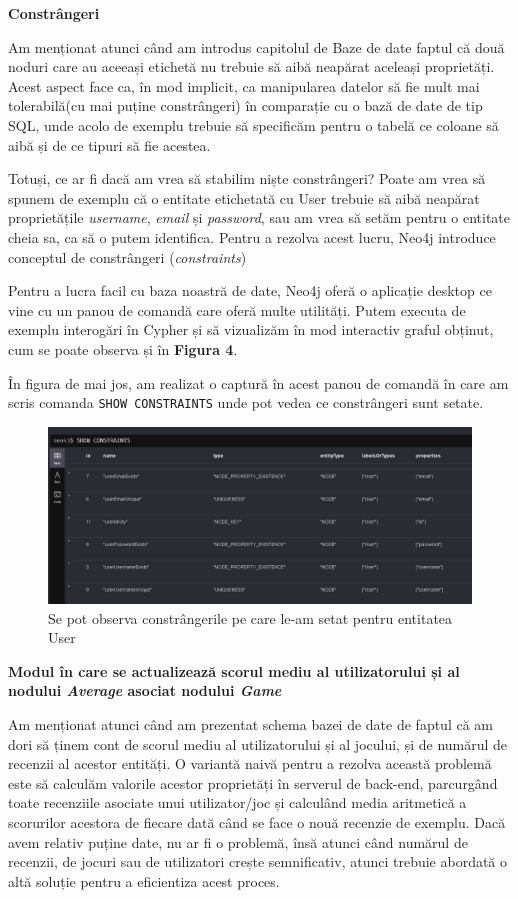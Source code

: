 \documentclass[12pt,a4paper]{report}
\begin{document}
\bigskip
\textbf{Constrângeri}
\bigskip

Am menționat atunci când am introdus capitolul de Baze de date faptul că două noduri care au aceeași etichetă nu trebuie să aibă neapărat aceleași proprietăți. Acest aspect face ca, în mod implicit, ca manipularea datelor să fie mult mai tolerabilă(cu mai puține constrângeri) în comparație cu o bază de date de tip SQL, unde acolo de exemplu trebuie să specificăm pentru o tabelă ce coloane să aibă și de ce tipuri să fie acestea.

Totuși, ce ar fi dacă am vrea să stabilim niște constrângeri? Poate am vrea să spunem de exemplu că o entitate etichetată cu User trebuie să aibă neapărat proprietățile \emph{username}, \emph{email} și \emph{password}, sau am vrea să setăm pentru o entitate cheia sa, ca să o putem identifica. Pentru a rezolva acest lucru, Neo4j introduce conceptul de constrângeri (\emph{constraints}) \cite{12}

Pentru a lucra facil cu baza noastră de date, Neo4j oferă o aplicație desktop ce vine cu un panou de comandă care oferă multe utilități. Putem executa de exemplu interogări în Cypher și să vizualizăm în mod interactiv graful obținut, cum se poate observa și în \textbf{Figura 4}.

În figura de mai jos, am realizat o captură în acest panou de comandă în care am scris comanda \texttt{SHOW CONSTRAINTS} unde pot vedea ce constrângeri sunt setate.

\begin{figure}[H]
\centering
\caption{}
\includegraphics[scale = 0.5]{exemplu_9_neo4j}
\caption*{Se pot observa constrângerile pe care le-am setat pentru entitatea User}
\end{figure}

\bigskip
\textbf{Modul în care se actualizează scorul mediu al utilizatorului și al nodului \emph{Average} asociat nodului \emph{Game}}
\bigskip

Am menționat atunci când am prezentat schema bazei de date de faptul că am dori să ținem cont de scorul mediu al utilizatorului și al jocului, și de numărul de recenzii al acestor entități. O variantă naivă pentru a rezolva această problemă este să calculăm valorile acestor proprietăți în serverul de back-end, parcurgând toate recenziile asociate unui utilizator/joc și calculând media aritmetică a scorurilor acestora de fiecare dată când se face o nouă recenzie de exemplu. Dacă avem relativ puține date, nu ar fi o problemă, însă atunci când numărul de recenzii, de jocuri sau de utilizatori crește semnificativ, atunci trebuie abordată o altă soluție pentru a eficientiza acest proces.
\end{document}
